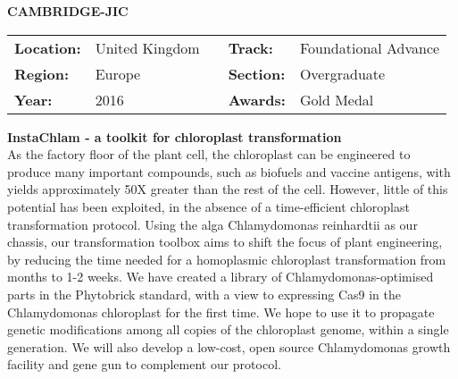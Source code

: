 \noindent\textbf{\uppercase{Cambridge-JIC}} 
\FloatBarrier
\begin{table}[h]
\begin{tabular}{lllll}
\textbf{Location:} & United Kingdom & \multicolumn{1}{|l}{} & \textbf{Track:}   & Foundational Advance \\
\textbf{Region:}   & Europe   & \multicolumn{1}{|l}{} & \textbf{Section:} & Overgraduate \\
\textbf{Year:}     & 2016   & \multicolumn{1}{|l}{} & \textbf{Awards:}  & Gold Medal
\end{tabular}
\end{table} 
\FloatBarrier
\noindent\textbf{InstaChlam - a toolkit for chloroplast transformation} \vspace{.2cm}\\
As the factory floor of the plant cell, the chloroplast can be engineered to produce many important compounds, such as biofuels and vaccine antigens, with yields approximately 50X greater than the rest of the cell. However, little of this potential has been exploited, in the absence of a time-efficient chloroplast transformation protocol. Using the alga Chlamydomonas reinhardtii as our chassis, our transformation toolbox aims to shift the focus of plant engineering, by reducing the time needed for a homoplasmic chloroplast transformation from months to 1-2 weeks. We have created a library of Chlamydomonas-optimised parts in the Phytobrick standard, with a view to expressing Cas9 in the Chlamydomonas chloroplast for the first time. We hope to use it to propagate genetic modifications among all copies of the chloroplast genome, within a single generation. We will also develop a low-cost, open source Chlamydomonas growth facility and gene gun to complement our protocol. 
\vspace{2cm}

